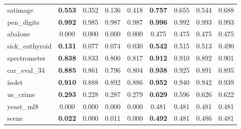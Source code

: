 \begin{figure}[ht]
\begin{tabular}{p{22mm}|*4{p{14mm}}|*4{p{14mm}}}
        satimage&\multicolumn{1}{c}{\textbf{0.553}}&\multicolumn{1}{c}{0.352}&\multicolumn{1}{c}{0.136}&\multicolumn{1}{c|}{0.418}&\multicolumn{1}{c}{\textbf{0.757}}&\multicolumn{1}{c}{0.655}&\multicolumn{1}{c}{0.544}&\multicolumn{1}{c}{0.688}\\
        pen\_digits&\multicolumn{1}{c}{\textbf{0.992}}&\multicolumn{1}{c}{0.985}&\multicolumn{1}{c}{0.987}&\multicolumn{1}{c|}{0.987}&\multicolumn{1}{c}{\textbf{0.996}}&\multicolumn{1}{c}{0.992}&\multicolumn{1}{c}{0.993}&\multicolumn{1}{c}{0.993}\\
        abalone&\multicolumn{1}{c}{0.000}&\multicolumn{1}{c}{0.000}&\multicolumn{1}{c}{0.000}&\multicolumn{1}{c|}{0.000}&\multicolumn{1}{c}{0.475}&\multicolumn{1}{c}{0.475}&\multicolumn{1}{c}{0.475}&\multicolumn{1}{c}{0.475}\\
        sick\_euthyroid&\multicolumn{1}{c}{\textbf{0.131}}&\multicolumn{1}{c}{0.077}&\multicolumn{1}{c}{0.074}&\multicolumn{1}{c|}{0.030}&\multicolumn{1}{c}{\textbf{0.542}}&\multicolumn{1}{c}{0.515}&\multicolumn{1}{c}{0.513}&\multicolumn{1}{c}{0.490}\\
        spectrometer&\multicolumn{1}{c}{\textbf{0.838}}&\multicolumn{1}{c}{0.833}&\multicolumn{1}{c}{0.800}&\multicolumn{1}{c|}{0.817}&\multicolumn{1}{c}{\textbf{0.912}}&\multicolumn{1}{c}{0.910}&\multicolumn{1}{c}{0.892}&\multicolumn{1}{c}{0.901}\\
        car\_eval\_34&\multicolumn{1}{c}{\textbf{0.885}}&\multicolumn{1}{c}{0.861}&\multicolumn{1}{c}{0.796}&\multicolumn{1}{c|}{0.804}&\multicolumn{1}{c}{\textbf{0.938}}&\multicolumn{1}{c}{0.925}&\multicolumn{1}{c}{0.891}&\multicolumn{1}{c}{0.895}\\
        isolet&\multicolumn{1}{c}{\textbf{0.910}}&\multicolumn{1}{c}{0.888}&\multicolumn{1}{c}{0.892}&\multicolumn{1}{c|}{0.886}&\multicolumn{1}{c}{\textbf{0.952}}&\multicolumn{1}{c}{0.940}&\multicolumn{1}{c}{0.942}&\multicolumn{1}{c}{0.939}\\
        us\_crime&\multicolumn{1}{c}{\textbf{0.293}}&\multicolumn{1}{c}{0.228}&\multicolumn{1}{c}{0.287}&\multicolumn{1}{c|}{0.279}&\multicolumn{1}{c}{\textbf{0.629}}&\multicolumn{1}{c}{0.596}&\multicolumn{1}{c}{0.626}&\multicolumn{1}{c}{0.622}\\
        yeast\_ml8&\multicolumn{1}{c}{0.000}&\multicolumn{1}{c}{0.000}&\multicolumn{1}{c}{0.000}&\multicolumn{1}{c|}{0.000}&\multicolumn{1}{c}{0.481}&\multicolumn{1}{c}{0.481}&\multicolumn{1}{c}{0.481}&\multicolumn{1}{c}{0.481}\\
        scene&\multicolumn{1}{c}{\textbf{0.022}}&\multicolumn{1}{c}{0.000}&\multicolumn{1}{c}{0.011}&\multicolumn{1}{c|}{0.000}&\multicolumn{1}{c}{\textbf{0.492}}&\multicolumn{1}{c}{0.481}&\multicolumn{1}{c}{0.486}&\multicolumn{1}{c}{0.481}\\

\end{tabular}
\end{figure}
